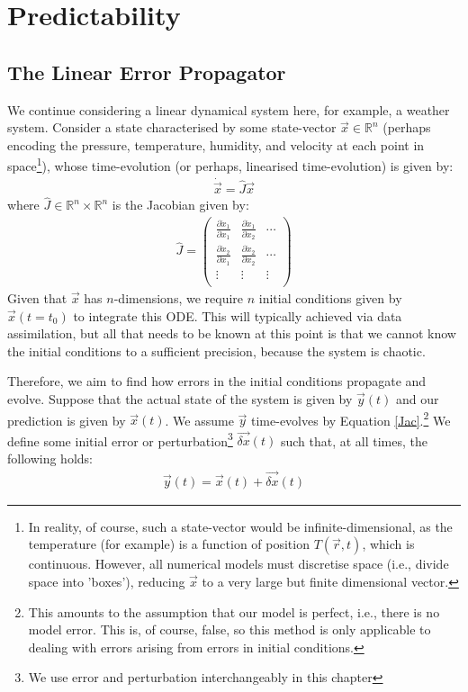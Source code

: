 \chapter{Predictability}\label{Predictability}

\section{The Linear Error Propagator}

We continue considering a linear dynamical system here, for example, a weather system. Consider a state characterised by some state-vector $\vec{x}\in\mathbb{R}^n$ (perhaps encoding the pressure, temperature, humidity, and velocity at each point in space\footnote{In reality, of course, such a state-vector would be infinite-dimensional, as the temperature (for example) is a function of position $T(\vec{r},t)$, which is continuous. However, all numerical models must discretise space (i.e., divide space into 'boxes'), reducing $\vec{x}$ to a very large but finite dimensional vector.}), whose time-evolution (or perhaps, linearised time-evolution) is given by:
\begin{align}\label{Jac}
    \dot{\vec{x}} = \hat{J}\vec{x}
\end{align}
where $\hat{J}\in\mathbb{R}^n\times\mathbb{R}^n$ is the Jacobian given by:
\begin{align}
{\hat{J}}  =  \left( \begin{array}{ccc}
  \frac{\partial \dot{x}_1}{\partial x_1} & \frac{\partial \dot{x}_1}{\partial x_2} & \cdots \\
  \frac{\partial \dot{x}_2}{\partial x_1} & \frac{\partial \dot{x}_2}{\partial x_2} & \cdots \\
  \vdots & \vdots & \vdots \\
 \end{array} \right)
\label{eq:Jdefmat}
\end{align} 
Given that $\vec{x}$ has $n$-dimensions, we require $n$ initial conditions given by $\vec{x}(t=t_0)$ to integrate this ODE. This will typically achieved via data assimilation, but all that needs to be known at this point is that we cannot know the initial conditions to a sufficient precision, because the system is chaotic.

Therefore, we aim to find how errors in the initial conditions propagate and evolve. Suppose that the actual state of the system is given by $\vec{y}(t)$ and our prediction is given by $\vec{x}(t)$. We assume $\vec{y}$ time-evolves by Equation \ref{Jac}.\footnote{This amounts to the assumption that our model is perfect, i.e., there is no model error. This is, of course, false, so this method is only applicable to dealing with errors arising from errors in initial conditions.} We define some initial error or perturbation\footnote{We use error and perturbation interchangeably in this chapter} $\vec{\delta x}(t)$ such that, at all times, the following holds:
\begin{align}
    \vec{y}(t)=\vec{x}(t)+\vec{\delta x}(t)
\end{align}

